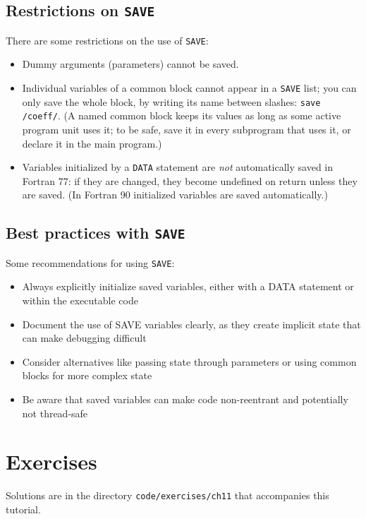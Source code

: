 \subsection{Restrictions on \texttt{SAVE}}

There are some restrictions on the use of \texttt{SAVE}:

\begin{itemize}
    \item Dummy arguments (parameters) cannot be saved.
    \item Individual variables of a common block cannot appear in a \texttt{SAVE} list; you can only save the whole block, by writing its name between slashes: \texttt{save /coeff/}. (A named common block keeps its values as long as some active program unit uses it; to be safe, save it in every subprogram that uses it, or declare it in the main program.)
    \item Variables initialized by a \texttt{DATA} statement are \emph{not} automatically saved in Fortran 77: if they are changed, they become undefined on return unless they are saved. (In Fortran 90 initialized variables are saved automatically.)
\end{itemize}

\subsection{Best practices with \texttt{SAVE}}

Some recommendations for using \texttt{SAVE}:

\begin{itemize}
    \item Always explicitly initialize saved variables, either with a DATA statement or within the executable code
    \item Document the use of SAVE variables clearly, as they create implicit state that can make debugging difficult
    \item Consider alternatives like passing state through parameters or using common blocks for more complex state
    \item Be aware that saved variables can make code non-reentrant and potentially not thread-safe
\end{itemize}

\section{Exercises}

Solutions are in the directory \texttt{code/exercises/ch11} that accompanies this tutorial.

